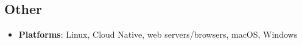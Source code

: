 \documentclass[
	a4paper,
	10pt,
	roman,
	colorlinks,
	linkcolor = purple,
	filecolor = purple,
	citecolor = blue,
	urlcolor = blue
]{moderncv}
\begin{document}
	\subsection{Other}
	\begin{itemize}
		\item \textbf{Platforms}: Linux, Cloud Native, web servers/browsers, macOS, Windows
	\end{itemize}
	
\end{document}
